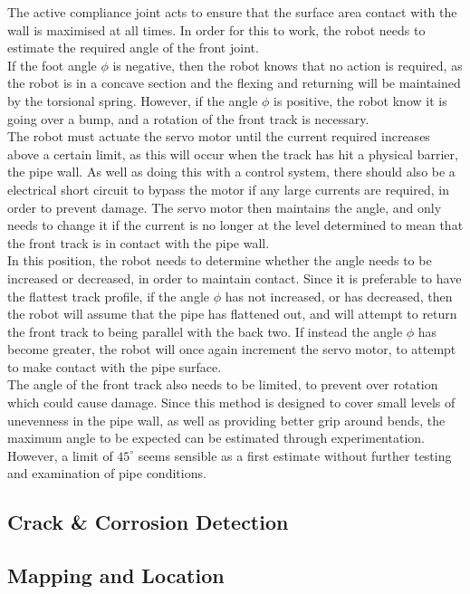 \documentclass[11pt]{article}		%
\begin{document}
		The active compliance joint acts to ensure that the surface area contact with the wall is maximised at all times.
		In order for this to work, the robot needs to estimate the required angle of the front joint.
		\\
		If the foot angle $\phi$ is negative, then the robot knows that no action is required, as the robot is in a concave section and the flexing and returning will be maintained by the torsional spring.
		However, if the angle $\phi$ is positive, the robot know it is going over a bump, and a rotation of the front track is necessary.
		\\
		The robot must actuate the servo motor until the current required increases above a certain limit, as this will occur when the track has hit a physical barrier, the pipe wall.
		As well as doing this with a control system, there should also be a electrical short circuit to bypass the motor if any large currents are required, in order to prevent damage.
		The servo motor then maintains the angle, and only needs to change it if the current is no longer at the level determined to mean that the front track is in contact with the pipe wall.
		\\
		In this position, the robot needs to determine whether the angle needs to be increased or decreased, in order to maintain contact.
		Since it is preferable to have the flattest track profile, if the angle $\phi$ has not increased, or has decreased, then the robot will assume that the pipe has flattened out, and will attempt to return the front track to being parallel with the back two.
		If instead the angle $\phi$ has become greater, the robot will once again increment the servo motor, to attempt to make contact with the pipe surface.
		\\
		The angle of the front track also needs to be limited, to prevent over rotation which could cause damage.
		Since this method is designed to cover small levels of unevenness in the pipe wall, as well as providing better grip around bends, the maximum angle to be expected can be estimated through experimentation.
		However, a limit of $45^\circ$ seems sensible as a first estimate without further testing and examination of pipe conditions.
				
		\subsection{Crack \& Corrosion Detection}
		
		\subsection{Mapping and Location}
		
\end{document}

